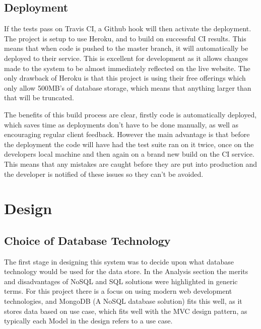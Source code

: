   \subsection{Deployment}
  If the tests pass on Travis CI, a Github hook will then activate the deployment. The project is setup to use Heroku\cite{heroku}, and to build on successful CI results. This means that when code is pushed to the master branch, it will automatically be deployed to their service. This is excellent for development as it allows changes made to the system to be almost immediately reflected on the live website. The only drawback of Heroku is that this project is using their free offerings which only allow 500MB's of database storage, which means that anything larger than that will be truncated. 

  The benefits of this build process are clear, firstly code is automatically deployed, which saves time as deployments don't have to be done manually, as well as encouraging regular client feedback. However the main advantage is that before the deployment the code will have had the test suite ran on it twice, once on the developers local machine and then again on a brand new build on the CI service. This means that any mistakes are caught before they are put into production and the developer is notified of these issues so they can't be avoided. 


\section{Design}
% 
% 
% 

\subsection{Choice of Database Technology}
The first stage in designing this system was to decide upon what database technology would be used for the data store. In the Analysis section the merits and disadvantages of NoSQL and SQL solutions were highlighted in generic terms. For this project there is a focus on using modern web development technologies, and MongoDB (A NoSQL database solution) fits this well, as it stores data based on use case, which fits well with the MVC design pattern, as typically each Model in the design refers to a use case. 

